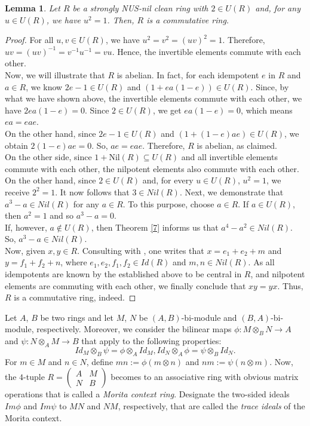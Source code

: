 \documentclass[12pt]{amsart}
\newtheorem{lemma}[theorem]{Lemma}
\theoremstyle{definition}
\begin{document}
\begin{lemma}\label{2.49}
Let $R$ be a strongly NUS-nil clean ring with $2 \in U(R)$ and, for any $u \in U(R)$, we have $u^2 = 1$. Then, $R$ is a commutative ring.
\end{lemma}

\begin{proof}
For all $u, v \in U(R)$, we have $u^2 = v^2 = (uv)^2 = 1$. Therefore, $uv = (uv)^{-1} = v^{-1}u^{-1} = vu$. Hence, the invertible elements commute with each other.\\	
Now, we will illustrate that $R$ is abelian. In fact, for each idempotent $e$ in $R$ and $a \in R$, we know $2e-1\in U(R)$ and $(1+ea(1-e)) \in U(R)$. Since, by what we have shown above, the invertible elements commute with each other, we have $2ea(1-e) =0$. Since $2 \in U(R)$, we get $ea(1-e)=0$, which means $ea = eae$.\\
On the other hand, since $2e-1\in U(R)$ and $(1+(1-e)ae) \in U(R)$, we obtain $2(1-e)ae =0$. So, $ae = eae$. Therefore, $R$ is abelian, as claimed.\\	
On the other side, since $1 + \text{Nil}(R) \subseteq U(R)$ and all invertible elements commute with each other, the nilpotent elements also commute with each other.\\	
On the other hand, since $2 \in U(R)$ and, for every $u \in U(R)$, $u^2 = 1$, we receive $2^2=1$. It now follows that $3\in Nil(R)$. Next, we demonstrate that $a^3-a\in Nil(R)$ for any $a\in R$. To this purpose, choose $a\in R$. If $a\in U(R)$, then $a^2=1$ and so $a^3-a=0$.\\
If, however, $a\not\in U(R)$, then Theorem \ref{7} informs us that $a^4-a^2\in Nil(R)$. So, $a^3-a\in Nil(R)$.\\
Now, given $x, y \in R$. Consulting with \cite[Proposition 2.8]{zhou}, one writes that $x=e_1+e_2+m$ and $y=f_1+f_2+n$, where $e_1,e_2,f_1,f_2\in Id(R)$ and $m,n\in Nil(R)$. As all idempotents are known by the established above to be central in $R$, and nilpotent elements are commuting with each other, we finally conclude that $xy=yx$. Thus, $R$ is a commutative ring, indeed.
\end{proof}

Let $A$, $B$ be two rings and let $M$, $N$ be $(A,B)$-bi-module and $(B,A)$-bi-module, respectively. Moreover, we consider the bilinear maps $\phi :M\otimes_{B}N\rightarrow A$ and $\psi:N\otimes_{A}M\rightarrow B$ that apply to the following properties:
$$Id_{M}\otimes_{B}\psi =\phi \otimes_{A}Id_{M},Id_{N}\otimes_{A}\phi =\psi \otimes_{B}Id_{N}.$$
For $m\in M$ and $n\in N$, define $mn:=\phi (m\otimes n)$ and $nm:=\psi (n\otimes m)$. Now, the $4$-tuple $R=\begin{pmatrix}
	A & M\\
	N & B
\end{pmatrix}$ becomes to an associative ring with obvious matrix operations that is called a {\it Morita context ring}. Designate the two-sided ideals $Im \phi$ and $Im \psi$ to $MN$ and $NM$, respectively, that are called the {\it trace ideals} of the Morita context.
\end{document}
